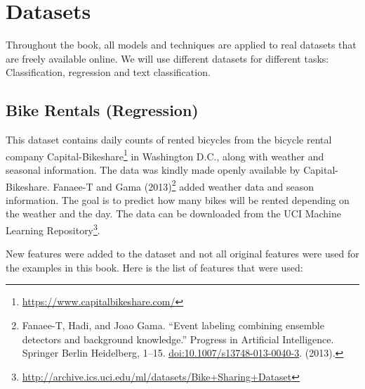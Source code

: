 \documentclass[
  11pt,
]{scrbook}
\renewcommand{\href}[2]{#2\footnote{\url{#1}}}
\begin{document}
\hypertarget{data}{%
\chapter{Datasets}\label{data}}

Throughout the book, all models and techniques are applied to real datasets that are freely available online.
We will use different datasets for different tasks:
Classification, regression and text classification.

\hypertarget{bike-data}{%
\section{Bike Rentals (Regression)}\label{bike-data}}

This dataset contains daily counts of rented bicycles from the bicycle rental company \href{https://www.capitalbikeshare.com/}{Capital-Bikeshare} in Washington D.C., along with weather and seasonal information.
The data was kindly made openly available by Capital-Bikeshare.
Fanaee-T and Gama (2013)\footnote{Fanaee-T, Hadi, and Joao Gama. ``Event labeling combining ensemble detectors and background knowledge.'' Progress in Artificial Intelligence. Springer Berlin Heidelberg, 1--15. \url{doi:10.1007/s13748-013-0040-3}. (2013).} added weather data and season information.
The goal is to predict how many bikes will be rented depending on the weather and the day.
The data can be downloaded from the \href{http://archive.ics.uci.edu/ml/datasets/Bike+Sharing+Dataset}{UCI Machine Learning Repository}.

New features were added to the dataset and not all original features were used for the examples in this book.
Here is the list of features that were used:
\end{document}
